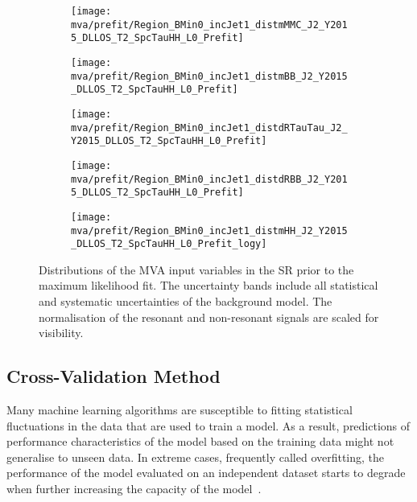 \begin{figure}[htbp]
  \centering

  \begin{subfigure}[t]{.46\textwidth}
    \texttt{[image: mva/prefit/Region\_BMin0\_incJet1\_distmMMC\_J2\_Y2015\_DLLOS\_T2\_SpcTauHH\_L0\_Prefit]}
  \end{subfigure}\hfill %
  \begin{subfigure}[t]{.46\textwidth}
    \texttt{[image: mva/prefit/Region\_BMin0\_incJet1\_distmBB\_J2\_Y2015\_DLLOS\_T2\_SpcTauHH\_L0\_Prefit]}
  \end{subfigure}

  \begin{subfigure}[t]{.46\textwidth}
    \texttt{[image: mva/prefit/Region\_BMin0\_incJet1\_distdRTauTau\_J2\_Y2015\_DLLOS\_T2\_SpcTauHH\_L0\_Prefit]}
  \end{subfigure}\hfill %
  \begin{subfigure}[t]{.46\textwidth}
    \texttt{[image: mva/prefit/Region\_BMin0\_incJet1\_distdRBB\_J2\_Y2015\_DLLOS\_T2\_SpcTauHH\_L0\_Prefit]}
  \end{subfigure}

  \begin{subfigure}[t]{.46\textwidth}
    \texttt{[image: mva/prefit/Region\_BMin0\_incJet1\_distmHH\_J2\_Y2015\_DLLOS\_T2\_SpcTauHH\_L0\_Prefit\_logy]}
  \end{subfigure}

  \caption[Distributions of the MVA input variables in the \hadhad
  SR.]{Distributions of the MVA input variables in the \hadhad SR prior to the
    maximum likelihood fit. The uncertainty bands include all statistical and
    systematic uncertainties of the background model. The normalisation of the
    resonant and non-resonant \HH signals are scaled for visibility.}%
  \label{fig:mva_inputs}
\end{figure}


\subsection{Cross-Validation Method}
\label{sec:mva_crossvalidation}

Many machine learning algorithms
are susceptible to fitting statistical fluctuations in the data that are used to
train a model. As a result, predictions of performance characteristics of the
model based on the training data might not generalise to unseen data. In extreme
cases, frequently called overfitting, the performance of the model evaluated on
an independent dataset starts to degrade when further increasing the capacity of
the model~\cite{hastie09}.

